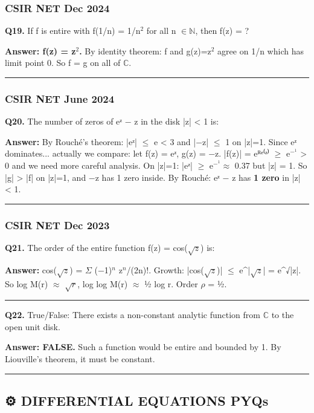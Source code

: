 \documentclass[12pt,a4paper,openany]{book}
\begin{document}
{{\subsubsection{CSIR NET Dec 2024}
\textbf{Q19.} If f is entire with f(1/n) = 1/n$^2$ for all n $\in\mathbb{N}$, then f(z) = ?

\textbf{Answer: f(z) = z$^2$.} By identity theorem: f and g(z)=z$^2$ agree on {1/n} which has limit point 0. So f = g on all of $\mathbb{C}$.

\bigskip\noindent\rule{\textwidth}{0.4pt}\bigskip

\subsubsection{CSIR NET June 2024}
\textbf{Q20.} The number of zeros of eᶻ − z in the disk |z| < 1 is:

\textbf{Answer:} By Rouché's theorem: |eᶻ| $\leq$ e < 3 and |−z| $\leq$ 1 on |z|=1. Since eᶻ dominates... actually we compare: let f(z) = eᶻ, g(z) = −z. |f(z)| = eᴿᵉ⁽ᶻ⁾ $\geq$ e$^{-}^1$ > 0 and we need more careful analysis. On |z|=1: |eᶻ| $\geq$ e$^{-}^1\approx$ 0.37 but |z| = 1. So |g| > |f| on |z|=1, and −z has 1 zero inside. By Rouché: eᶻ − z has \textbf{1 zero} in |z| < 1.

\bigskip\noindent\rule{\textwidth}{0.4pt}\bigskip

\subsubsection{CSIR NET Dec 2023}
\textbf{Q21.} The order of the entire function f(z) = cos($\sqrt{z}$) is:

\textbf{Answer:} cos($\sqrt{z}$) = $\Sigma$ (−1)$^n$ z$^n$/(2n)!. Growth: |cos($\sqrt{z}$)| $\leq$ e^|$\sqrt{z}$| = e^√|z|. So log M(r) $\approx$ $\sqrt{r}$, log log M(r) $\approx$ ½ log r. Order $\rho$ = ½.

\bigskip\noindent\rule{\textwidth}{0.4pt}\bigskip

\textbf{Q22.} True/False: There exists a non-constant analytic function from $\mathbb{C}$ to the open unit disk.

\textbf{Answer: FALSE.} Such a function would be entire and bounded by 1. By Liouville's theorem, it must be constant.

\bigskip\noindent\rule{\textwidth}{0.4pt}\bigskip

\subsection{⚙️ DIFFERENTIAL EQUATIONS PYQs}

}}
\end{document}
